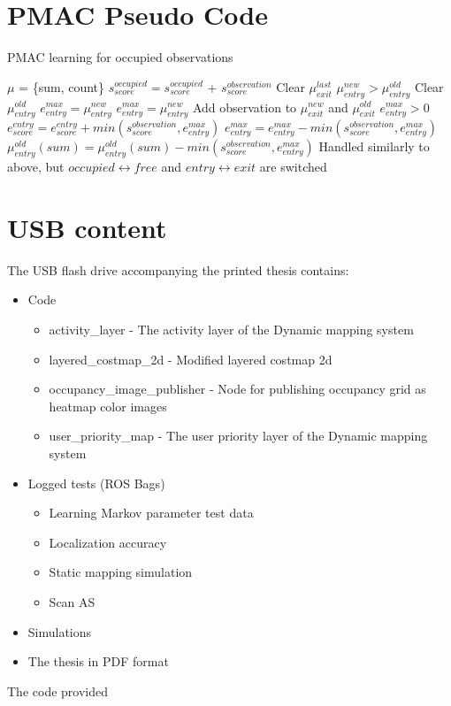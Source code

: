 \chapter{PMAC Pseudo Code}
\label{appendix:pmac_pseudo_code}
\begin{algorithm}
	\caption{PMAC learning for occupied observations}
	\label{al:object_recognition}
	\begin{algorithmic}[1]
		\State $\mu$ = \{sum, count\}
		\State $s_{score}^{occupied} = s_{score}^{occupied}$ + $s_{score}^{observation}$
		\State Clear $\mu_{exit}^{last}$
		\If $\mu_{entry}^{new} > \mu_{entry}^{old}$ 
		\State Clear $\mu_{entry}^{old}$
		\State $e_{entry}^{max} = \mu_{entry}^{new}$
		\Else
		\State $e_{entry}^{max} = \mu_{entry}^{new}$
		\EndIf
		\EndIf
		\State Add observation to $\mu_{exit}^{new}$ and $\mu_{exit}^{old}$
		\If $e_{entry}^{max} > 0$
		\State $e_{score}^{entry} = e_{score}^{entry} + min(s_{score}^{observation},e_{entry}^{max})$
		\State $e_{entry}^{max} = e_{entry}^{max} - min(s_{score}^{observation},e_{entry}^{max})$
		\State $\mu_{entry}^{old}(sum) = \mu_{entry}^{old}(sum) - min(s_{score}^{observation},e_{entry}^{max})$
		\EndIf
		\EndIf
			\State Handled similarly to above, but $occupied \leftrightarrow free$ and $entry \leftrightarrow exit$ are switched
		\EndIf
		\EndFor
	\end{algorithmic}
\end{algorithm}


\chapter{USB content}
\label{appendix:usb_content}
The USB flash drive accompanying the printed thesis contains:

\begin{itemize}
	\item Code 
	\begin{itemize}
		\item activity\_layer - The activity layer of the Dynamic mapping system
		\item layered\_costmap\_2d - Modified layered costmap 2d
		\item occupancy\_image\_publisher - Node for publishing occupancy grid as heatmap color images
		\item user\_priority\_map - The user priority layer of the Dynamic mapping system
	\end{itemize}
	\item Logged tests (ROS Bags)
	\begin{itemize}
		\item Learning Markov parameter test data
		\item Localization accuracy
		\item Static mapping simulation
		\item Scan AS
	\end{itemize}
	\item Simulations
	\item The thesis in PDF format
\end{itemize}

The code provided 